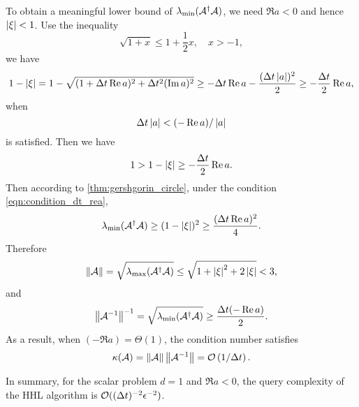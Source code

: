 To obtain a meaningful lower bound of $\lambda_{\min}(\mathcal{A}^{\dag}\mathcal{A})$, we need $\Re a<0$ and hence $\left\lvert\xi\right\rvert<1$. Use the inequality
\begin{equation}
\sqrt{1+x}\le 1+\frac12 x, \quad x>-1, 
\end{equation}
we have
\begin{equation}
1-\left\lvert\xi\right\rvert= 1-\sqrt{(1+\Delta t\operatorname{Re} a )^2+\Delta t^2(\operatorname{Im} a )^2}\ge -\Delta t\operatorname{Re} a-\frac{(\Delta t \left\lvert a\right\rvert)^2}{2}\ge -\frac{\Delta t}{2}\operatorname{Re} a,
\end{equation}
when 
\begin{equation}
\Delta t\left\lvert a\right\rvert<(-\operatorname{Re} a)/\left\lvert a\right\rvert
\label{eqn:condition_dt_rea}
\end{equation}
is satisfied.
Then we have
\begin{equation}
1>1-\left\lvert\xi\right\rvert\ge -\frac{\Delta t}{2}\operatorname{Re} a.
\end{equation}
Then according to \cref{thm:gershgorin_circle}, under the condition \cref{eqn:condition_dt_rea},
\begin{equation}
\lambda_{\min}(\mathcal{A}^{\dag}\mathcal{A})\ge (1-\left\lvert\xi\right\rvert)^2\ge \frac{(\Delta t \operatorname{Re} a)^2}{4}.
\end{equation}
Therefore
\begin{equation}
\left\lVert\mathcal{A}\right\rVert=\sqrt{\lambda_{\max}(\mathcal{A}^{\dag}\mathcal{A})} \le \sqrt{1+\left\lvert\xi\right\rvert^2+2\left\lvert\xi\right\rvert}< 3,
\label{eqn:A_scalar_max}
\end{equation}
and
\begin{equation}
 \left\lVert\mathcal{A}^{-1}\right\rVert^{-1}=\sqrt{\lambda_{\min}(\mathcal{A}^{\dag}\mathcal{A})}\ge  \frac{\Delta t (-\operatorname{Re} a)}{2}.
\label{eqn:A_scalar_min}
\end{equation}
As a result, when $(-\Re a)=\Theta(1)$, the condition number satisfies
\begin{equation}
\kappa(\mathcal{A})=\left\lVert\mathcal{A}\right\rVert\left\lVert\mathcal{A}^{-1}\right\rVert=\mathcal{O}\left(1/\Delta t\right).
\label{eqn:kappaA_scalar_ode}
\end{equation}

In summary, for the scalar problem $d=1$ and $\Re a<0$, the query complexity of the HHL algorithm is $\mathcal{O}((\Delta t)^{-2}\epsilon^{-2})$.


